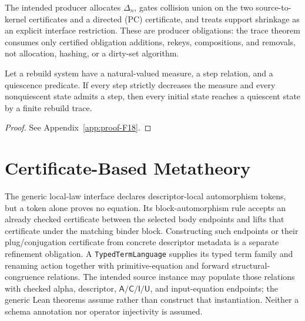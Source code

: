 The intended producer allocates $\Delta_n$, gates collision union on the two
source-to-kernel certificates and a directed (PC) certificate, and treats
support shrinkage as an explicit interface restriction.  These are producer
obligations: the trace theorem consumes only certified obligation additions, rekeys,
compositions, and removals, not allocation, hashing, or a dirty-set algorithm.

\begin{proposition}
\label{res:F18}
Let a rebuild system have a natural-valued measure, a step relation, and a
quiescence predicate.  If every step strictly decreases the measure and every
nonquiescent state admits a step, then every initial state reaches a
quiescent state by a finite rebuild trace.
\end{proposition}
\begin{proof}See Appendix~\ref{app:proof-F18}.\end{proof}

\section{Certificate-Based Metatheory}
\label{sec:metatheory}

The generic local-law interface declares descriptor-local automorphism tokens,
but a token alone proves no equation.  Its block-automorphism rule accepts an
already checked certificate between the selected body endpoints and lifts that
certificate under the matching binder block.  Constructing such endpoints or
their plug/conjugation certificate from concrete descriptor metadata is a
separate refinement obligation.
A \texttt{TypedTermLanguage} supplies its typed term family and renaming action
together with primitive-equation and forward structural-congruence relations.
The intended source instance may populate those relations with checked alpha,
descriptor, $\mathsf A/\mathsf C/\mathsf I/\mathsf U$, and input-equation
endpoints; the generic Lean theorems assume rather than construct that
instantiation.  Neither a schema annotation nor operator injectivity is assumed.

